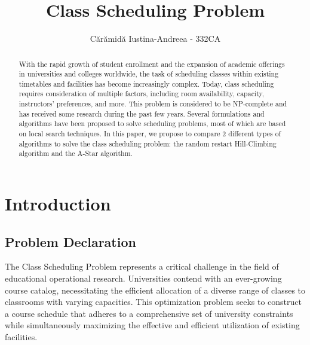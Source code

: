 \documentclass[runningheads]{paper}
\begin{document}
%
\title{Class Scheduling Problem}
%
\author{Cărămidă Iustina-Andreea - 332CA}
%
%
\maketitle              %
%
\begin{abstract}
    With the rapid growth of student enrollment and the expansion of academic 
    offerings in universities and colleges worldwide, the task of scheduling 
    classes within existing timetables and facilities has become increasingly 
    complex. Today, class scheduling requires consideration of multiple factors, 
    including room availability, capacity, instructors' preferences, and more. This problem is considered to be 
    NP-complete and has received some research during the past few years. 
    Several formulations and algorithms have been proposed to solve scheduling
    problems, most of which are based on local search techniques. In this paper, 
    we propose to compare 2 different types of algorithms to solve the class
    scheduling problem: the random restart Hill-Climbing algorithm and the A-Star algorithm.

\end{abstract}


\section{Introduction}
\subsection{Problem Declaration}

\quad The Class Scheduling Problem represents a critical challenge in the field 
of educational operational research.  Universities contend with an ever-growing 
course catalog, necessitating the efficient allocation of a diverse range of 
classes to classrooms with varying capacities. This optimization problem seeks 
to construct a course schedule that adheres to a comprehensive set of university 
constraints while simultaneously maximizing the effective and efficient 
utilization of existing facilities.
\end{document}
